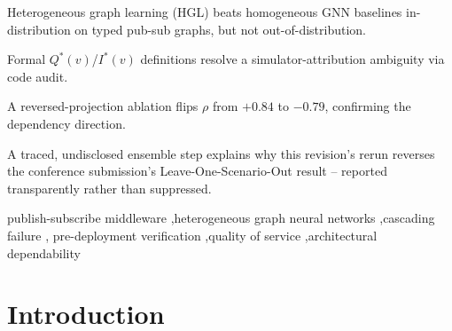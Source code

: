 \documentclass[review]{elsarticle}
\begin{document}
\begin{frontmatter}
\begin{highlights}
\item Heterogeneous graph learning (HGL) beats homogeneous GNN baselines in-distribution on typed pub-sub graphs, but not out-of-distribution.
\item Formal $Q^*(v)$/$I^*(v)$ definitions resolve a simulator-attribution ambiguity via code audit.
\item A reversed-projection ablation flips $\rho$ from $+0.84$ to $-0.79$, confirming the dependency direction.
\item A traced, undisclosed ensemble step explains why this revision's rerun reverses the conference submission's Leave-One-Scenario-Out result -- reported transparently rather than suppressed.
\end{highlights}

\begin{keyword}
publish-subscribe middleware \sep heterogeneous graph neural networks \sep cascading failure \sep
pre-deployment verification \sep quality of service \sep architectural dependability
\end{keyword}

\end{frontmatter}

\section{Introduction}
\end{document}
